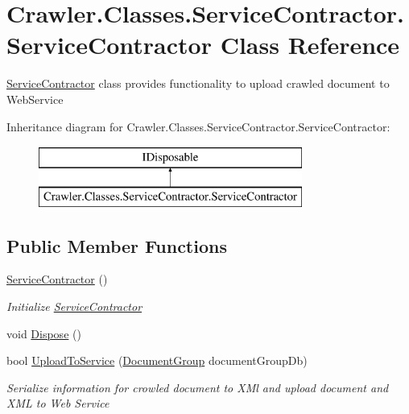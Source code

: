 \hypertarget{class_crawler_1_1_classes_1_1_service_contractor_1_1_service_contractor}{\section{Crawler.\-Classes.\-Service\-Contractor.\-Service\-Contractor Class Reference}
\label{class_crawler_1_1_classes_1_1_service_contractor_1_1_service_contractor}
}


\hyperlink{class_crawler_1_1_classes_1_1_service_contractor_1_1_service_contractor}{Service\-Contractor} class provides functionality to upload crawled document to Web\-Service  


Inheritance diagram for Crawler.\-Classes.\-Service\-Contractor.\-Service\-Contractor\-:\begin{figure}[H]
\begin{center}
\leavevmode
\includegraphics[height=2.000000cm]{class_crawler_1_1_classes_1_1_service_contractor_1_1_service_contractor}
\end{center}
\end{figure}
\subsection*{Public Member Functions}
\begin{DoxyCompactItemize}
\item 
\hyperlink{class_crawler_1_1_classes_1_1_service_contractor_1_1_service_contractor_a1297b730b35de32fd7631b1fffe266fa}{Service\-Contractor} ()
\begin{DoxyCompactList}\small\item\em Initialize \hyperlink{class_crawler_1_1_classes_1_1_service_contractor_1_1_service_contractor}{Service\-Contractor} \end{DoxyCompactList}\item 
void \hyperlink{class_crawler_1_1_classes_1_1_service_contractor_1_1_service_contractor_a9d054727c9e326f6e2e657f31a1c3eb2}{Dispose} ()
\item 
bool \hyperlink{class_crawler_1_1_classes_1_1_service_contractor_1_1_service_contractor_a278670e61ffefa79bd8ea3dd90b0265c}{Upload\-To\-Service} (\hyperlink{class_crawler_e_u_cases_1_1_data_1_1_document_group}{Document\-Group} document\-Group\-Db)
\begin{DoxyCompactList}\small\item\em Serialize information for crowled document to X\-Ml and upload document and X\-M\-L to Web Service \end{DoxyCompactList}\end{DoxyCompactItemize}
